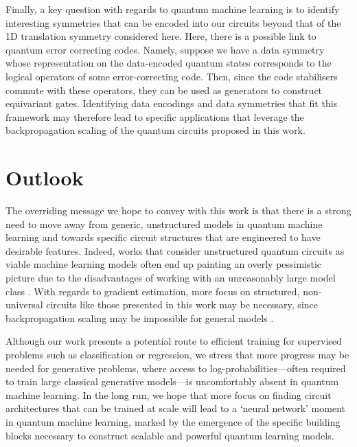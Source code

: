 \documentclass[twocolumn]{revtex4-2}
\begin{document}
Finally, a key question with regards to quantum machine learning is to identify interesting symmetries that can be encoded into our circuits beyond that of the 1D translation symmetry considered here. Here, there is a possible link to quantum error correcting codes. Namely, suppose we have a data symmetry whose representation on the data-encoded quantum states corresponds to the logical operators of some error-correcting code. Then, since the code stabilisers commute with these operators, they can be used as generators to construct equivariant gates. Identifying data encodings and data symmetries that fit this framework may therefore lead to specific applications that leverage the backpropagation scaling of the quantum circuits proposed in this work. 


\section{Outlook}
The overriding message we hope to convey with this work is that there is a strong need to move away from generic, unstructured models in quantum machine learning and towards specific circuit structures that are engineered to have desirable features. Indeed, works that consider unstructured quantum circuits as viable machine learning models often end up painting an overly pessimistic picture due to the disadvantages of working with an unreasonably large model class \cite{mcclean2018barren,anschuetz2022quantum,anschuetz2021critical,campos2021}. With regards to gradient estimation, more focus on structured, non-universal circuits like those presented in this work may be necessary, since backpropagation scaling may be impossible for general models \cite{abbas2023quantum}.
 

Although our work presents a potential route to efficient training for supervised problems such as classification or regression, we stress that more progress may be needed for generative problems, where access to log-probabilities---often required to train large classical generative models---is uncomfortably absent in quantum machine learning. In the long run, we hope that more focus on finding circuit architectures that can be trained at scale will lead to a `neural network' moment in quantum machine learning, marked by the emergence of the specific building blocks necessary to construct scalable and powerful quantum learning models. 
\end{document}
